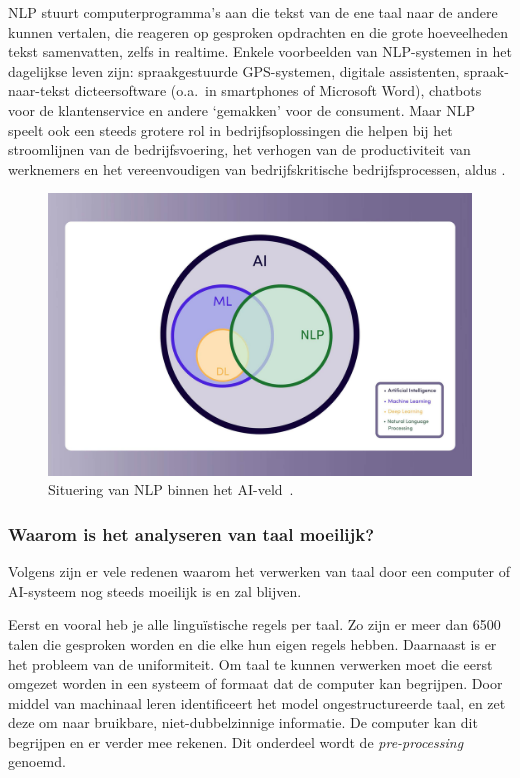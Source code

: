 NLP stuurt computerprogramma's aan die tekst van de ene taal naar de andere kunnen vertalen, die reageren op gesproken opdrachten en die grote hoeveelheden tekst samenvatten, zelfs in realtime. Enkele voorbeelden van NLP-systemen in het dagelijkse leven zijn: spraakgestuurde GPS-systemen, digitale assistenten, spraak-naar-tekst dicteersoftware (o.a.\ in smartphones of Microsoft Word), chatbots voor de klantenservice en andere `gemakken' voor de consument. Maar NLP speelt ook een steeds grotere rol in bedrijfsoplossingen die helpen bij het stroomlijnen van de bedrijfsvoering, het verhogen van de productiviteit van werknemers en het vereenvoudigen van bedrijfskritische bedrijfsprocessen, aldus \textcite{IBMCloudEducation2021}.

\begin{figure}
    \centering
    \includegraphics[width=.8\textwidth]{./img/nlp_field_ai.jpeg}
    \caption{\label{fig:nlp_field} Situering van NLP binnen het AI-veld~\autocite{Kleinings2022}.}
\end{figure}

\subsubsection{Waarom is het analyseren van taal moeilijk?}
Volgens \textcite{Kleinings2022} zijn er vele redenen waarom het verwerken van taal door een computer of AI-systeem nog steeds moeilijk is en zal blijven.

Eerst en vooral heb je alle linguïstische regels per taal. Zo zijn er meer dan 6500 talen die gesproken worden en die elke hun eigen regels hebben.
Daarnaast is er het probleem van de uniformiteit. Om taal te kunnen verwerken moet die eerst omgezet worden in een systeem of formaat dat de computer kan begrijpen. Door middel van machinaal leren identificeert het model ongestructureerde taal, en zet deze om naar bruikbare, niet-dubbelzinnige informatie. De computer kan dit begrijpen en er verder mee rekenen. Dit onderdeel wordt de \textit{pre-processing} genoemd.

